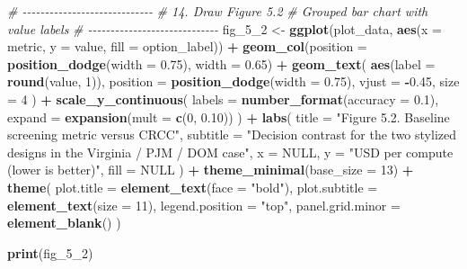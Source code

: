 \documentclass[
]{article}
\newenvironment{Shaded}{\begin{snugshade}}{\end{snugshade}}
\newcommand{\AttributeTok}[1]{\textcolor[rgb]{0.13,0.29,0.53}{#1}}
\newcommand{\CommentTok}[1]{\textcolor[rgb]{0.56,0.35,0.01}{\textit{#1}}}
\newcommand{\ConstantTok}[1]{\textcolor[rgb]{0.56,0.35,0.01}{#1}}
\newcommand{\DecValTok}[1]{\textcolor[rgb]{0.00,0.00,0.81}{#1}}
\newcommand{\FloatTok}[1]{\textcolor[rgb]{0.00,0.00,0.81}{#1}}
\newcommand{\FunctionTok}[1]{\textcolor[rgb]{0.13,0.29,0.53}{\textbf{#1}}}
\newcommand{\NormalTok}[1]{#1}
\newcommand{\OtherTok}[1]{\textcolor[rgb]{0.56,0.35,0.01}{#1}}
\newcommand{\SpecialCharTok}[1]{\textcolor[rgb]{0.81,0.36,0.00}{\textbf{#1}}}
\newcommand{\StringTok}[1]{\textcolor[rgb]{0.31,0.60,0.02}{#1}}
\begin{document}
\begin{Shaded}
\begin{Highlighting}[]
\CommentTok{\# {-}{-}{-}{-}{-}{-}{-}{-}{-}{-}{-}{-}{-}{-}{-}{-}{-}{-}{-}{-}{-}{-}{-}{-}{-}{-}{-}{-}{-}}
\CommentTok{\# 14. Draw Figure 5.2}
\CommentTok{\# Grouped bar chart with value labels}
\CommentTok{\# {-}{-}{-}{-}{-}{-}{-}{-}{-}{-}{-}{-}{-}{-}{-}{-}{-}{-}{-}{-}{-}{-}{-}{-}{-}{-}{-}{-}{-}}
\NormalTok{fig\_5\_2 }\OtherTok{\textless{}{-}} \FunctionTok{ggplot}\NormalTok{(plot\_data,}
                  \FunctionTok{aes}\NormalTok{(}\AttributeTok{x =}\NormalTok{ metric, }\AttributeTok{y =}\NormalTok{ value, }\AttributeTok{fill =}\NormalTok{ option\_label)) }\SpecialCharTok{+}
  \FunctionTok{geom\_col}\NormalTok{(}\AttributeTok{position =} \FunctionTok{position\_dodge}\NormalTok{(}\AttributeTok{width =} \FloatTok{0.75}\NormalTok{), }\AttributeTok{width =} \FloatTok{0.65}\NormalTok{) }\SpecialCharTok{+}
  \FunctionTok{geom\_text}\NormalTok{(}
    \FunctionTok{aes}\NormalTok{(}\AttributeTok{label =} \FunctionTok{round}\NormalTok{(value, }\DecValTok{1}\NormalTok{)),}
    \AttributeTok{position =} \FunctionTok{position\_dodge}\NormalTok{(}\AttributeTok{width =} \FloatTok{0.75}\NormalTok{),}
    \AttributeTok{vjust =} \SpecialCharTok{{-}}\FloatTok{0.45}\NormalTok{,}
    \AttributeTok{size =} \DecValTok{4}
\NormalTok{  ) }\SpecialCharTok{+}
  \FunctionTok{scale\_y\_continuous}\NormalTok{(}
    \AttributeTok{labels =} \FunctionTok{number\_format}\NormalTok{(}\AttributeTok{accuracy =} \FloatTok{0.1}\NormalTok{),}
    \AttributeTok{expand =} \FunctionTok{expansion}\NormalTok{(}\AttributeTok{mult =} \FunctionTok{c}\NormalTok{(}\DecValTok{0}\NormalTok{, }\FloatTok{0.10}\NormalTok{))}
\NormalTok{  ) }\SpecialCharTok{+}
  \FunctionTok{labs}\NormalTok{(}
    \AttributeTok{title =} \StringTok{"Figure 5.2. Baseline screening metric versus CRCC"}\NormalTok{,}
    \AttributeTok{subtitle =} \StringTok{"Decision contrast for the two stylized designs in the Virginia / PJM / DOM case"}\NormalTok{,}
    \AttributeTok{x =} \ConstantTok{NULL}\NormalTok{,}
    \AttributeTok{y =} \StringTok{"USD per compute (lower is better)"}\NormalTok{,}
    \AttributeTok{fill =} \ConstantTok{NULL}
\NormalTok{  ) }\SpecialCharTok{+}
  \FunctionTok{theme\_minimal}\NormalTok{(}\AttributeTok{base\_size =} \DecValTok{13}\NormalTok{) }\SpecialCharTok{+}
  \FunctionTok{theme}\NormalTok{(}
    \AttributeTok{plot.title =} \FunctionTok{element\_text}\NormalTok{(}\AttributeTok{face =} \StringTok{"bold"}\NormalTok{),}
    \AttributeTok{plot.subtitle =} \FunctionTok{element\_text}\NormalTok{(}\AttributeTok{size =} \DecValTok{11}\NormalTok{),}
    \AttributeTok{legend.position =} \StringTok{"top"}\NormalTok{,}
    \AttributeTok{panel.grid.minor =} \FunctionTok{element\_blank}\NormalTok{()}
\NormalTok{  )}

\FunctionTok{print}\NormalTok{(fig\_5\_2)}
\end{Highlighting}
\end{Shaded}
\end{document}

